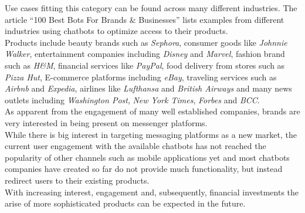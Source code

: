 Use cases fitting this category can be found across many different industries.
The article ``100 Best Bots For Brands \& Businesses''\cite{topbots} lists examples from different industries using chatbots to optimize access to their products.
\\
Products include beauty brands such as \emph{Sephora}, consumer goods like \emph{Johnnie Walker}, entertainment companies including \emph{Disney} and \emph{Marvel}, fashion brand such as \emph{H\&M}, financial services like \emph{PayPal}, food delivery from stores such as \emph{Pizza Hut}, E-commerce platforms including \emph{eBay}, traveling services such as \emph{Airbnb} and \emph{Expedia}, airlines like \emph{Lufthansa} and \emph{British Airways} and many news outlets including \emph{Washington Post}, \emph{New York Times}, \emph{Forbes} and \emph{BCC}.
\\


As apparent from the engagement of many well established companies, brands are very interested in being present on messenger platforms.
\\

While there is big interest in targeting messaging platforms as a new market, the current user engagement with the available chatbots has not reached the popularity of other channels such as mobile applications yet
and most chatbots companies have created so far do not provide much functionality, but instead redirect users to their existing products.
\\

With increasing interest, engagement and, subsequently, financial investments the arise of more sophisticated products can be expected in the future.
